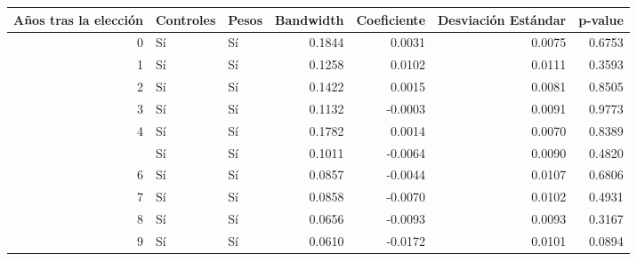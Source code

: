 
\begin{tabular}{rllrrrr}
\toprule
Años tras la elección & Controles & Pesos & Bandwidth & Coeficiente & Desviación Estándar & p-value\\
\midrule
0 & Sí & Sí & 0.1844 & 0.0031 & 0.0075 & 0.6753\\
1 & Sí & Sí & 0.1258 & 0.0102 & 0.0111 & 0.3593\\
2 & Sí & Sí & 0.1422 & 0.0015 & 0.0081 & 0.8505\\
3 & Sí & Sí & 0.1132 & -0.0003 & 0.0091 & 0.9773\\
4 & Sí & Sí & 0.1782 & 0.0014 & 0.0070 & 0.8389\\
\addlinespace
5 & Sí & Sí & 0.1011 & -0.0064 & 0.0090 & 0.4820\\
6 & Sí & Sí & 0.0857 & -0.0044 & 0.0107 & 0.6806\\
7 & Sí & Sí & 0.0858 & -0.0070 & 0.0102 & 0.4931\\
8 & Sí & Sí & 0.0656 & -0.0093 & 0.0093 & 0.3167\\
9 & Sí & Sí & 0.0610 & -0.0172 & 0.0101 & 0.0894\\
\bottomrule
\end{tabular}